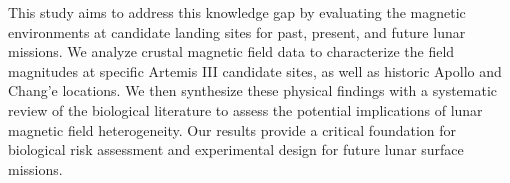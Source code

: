 This study aims to address this knowledge gap by evaluating the magnetic environments at candidate landing sites for past, present, and future lunar missions. We analyze crustal magnetic field data to characterize the field magnitudes at specific Artemis III candidate sites, as well as historic Apollo and Chang'e locations. We then synthesize these physical findings with a systematic review of the biological literature to assess the potential implications of lunar magnetic field heterogeneity. Our results provide a critical foundation for biological risk assessment and experimental design for future lunar surface missions.
